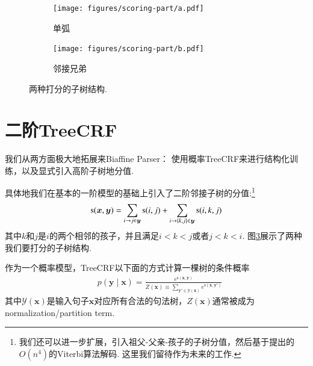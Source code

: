 \begin{figure}[tb]
    \centering
    \begin{subfigure}[b]{0.45\textwidth}
        \centering
        \texttt{[image: figures/scoring-part/a.pdf]}
        \caption{单弧}
        \label{fig:scoring-part-a}
    \end{subfigure}
    \begin{subfigure}[b]{0.45\textwidth}
        \centering
        \texttt{[image: figures/scoring-part/b.pdf]}
        \caption{邻接兄弟}
        \label{fig:scoring-part-b}
    \end{subfigure}
    \caption{两种打分的子树结构.}
    \label{fig:scoring-part}
\end{figure}



\section{二阶TreeCRF}\label{2o-tree-crf}
我们从两方面极大地拓展来Biaffine Parser：
使用概率TreeCRF来进行结构化训练，以及显式引入高阶子树地分值.

具体地我们在基本的一阶模型的基础上引入了二阶邻接子树的分值:\footnote{
    我们还可以进一步扩展，引入祖父-父亲-孩子的子树分值，然后基于\cite{koo-collins-2010-efficient}提出的$O(n^4)$的Viterbi算法解码.
    这里我们留待作为未来的工作.
}
\begin{equation}\label{eq:score-definition-2o}
    \mathrm{s}(\boldsymbol{x}, \boldsymbol{y}) = \sum_{i\rightarrow j \in \boldsymbol{y}}\mathrm{s}(i,j) + \sum_{
        i\rightarrow \{k,j\} \in \boldsymbol{y} %
    } \mathrm{s}(i,k,j)
\end{equation}
其中$k$和$j$是$i$的两个相邻的孩子，并且满足$i < k < j$或者$j < k < i$.
图\ref{fig:scoring-part}展示了两种我们要打分的子树结构.

作为一个概率模型，TreeCRF以下面的方式计算一棵树的条件概率
\begin{equation}\label{eq:prob-labeled}
    \begin{split}
        & p(\boldsymbol{y}\mid\boldsymbol{x})  = \frac{e^{\mathrm{s}(\boldsymbol{x},\boldsymbol{y})}}{Z(\boldsymbol{x}) \equiv \sum_{\boldsymbol{y'} \in \mathcal{Y}(\boldsymbol{x})} {e^{\mathrm{s}(\boldsymbol{x},\boldsymbol{y'})}}}
    \end{split}
\end{equation}
其中$\mathcal{Y}(\boldsymbol{x})$是输入句子$\boldsymbol{x}$对应所有合法的句法树，$Z(\boldsymbol{x})$通常被成为normalization/partition term.


